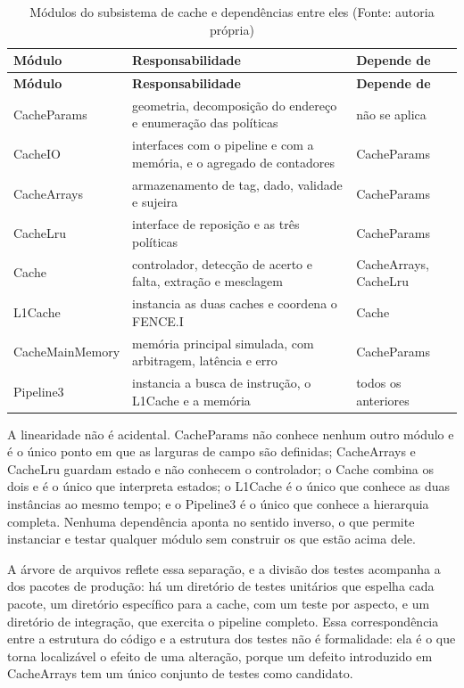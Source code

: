 {\small
\begin{longtable}{@{}>{\raggedright\arraybackslash}p{}>{\raggedright\arraybackslash}p{}>{\raggedright\arraybackslash}p{}@{}}
\caption[Módulos do subsistema de cache e dependências entre eles]{Módulos do subsistema de cache e dependências entre eles (Fonte: autoria própria)}\label{tab:5.1}\\
\hline
\textbf{Módulo} & \textbf{Responsabilidade} & \textbf{Depende de} \\
\hline
\endfirsthead
\hline
\textbf{Módulo} & \textbf{Responsabilidade} & \textbf{Depende de} \\
\hline
\endhead
\hline
\endlastfoot
CacheParams & geometria, decomposição do endereço e enumeração das políticas & não se aplica \\
CacheIO & interfaces com o pipeline e com a memória, e o agregado de contadores & CacheParams \\
CacheArrays & armazenamento de tag, dado, validade e sujeira & CacheParams \\
CacheLru & interface de reposição e as três políticas & CacheParams \\
Cache & controlador, detecção de acerto e falta, extração e mesclagem & CacheArrays, CacheLru \\
L1Cache & instancia as duas caches e coordena o FENCE.I & Cache \\
CacheMainMemory & memória principal simulada, com arbitragem, latência e erro & CacheParams \\
Pipeline3 & instancia a busca de instrução, o L1Cache e a memória & todos os anteriores \\
\end{longtable}
}

A linearidade não é acidental. CacheParams não conhece nenhum outro módulo e é o único ponto em que as larguras de campo são definidas; CacheArrays e CacheLru guardam estado e não conhecem o controlador; o Cache combina os dois e é o único que interpreta estados; o L1Cache é o único que conhece as duas instâncias ao mesmo tempo; e o Pipeline3 é o único que conhece a hierarquia completa. Nenhuma dependência aponta no sentido inverso, o que permite instanciar e testar qualquer módulo sem construir os que estão acima dele.

A árvore de arquivos reflete essa separação, e a divisão dos testes acompanha a dos pacotes de produção: há um diretório de testes unitários que espelha cada pacote, um diretório específico para a cache, com um teste por aspecto, e um diretório de integração, que exercita o pipeline completo. Essa correspondência entre a estrutura do código e a estrutura dos testes não é formalidade: ela é o que torna localizável o efeito de uma alteração, porque um defeito introduzido em CacheArrays tem um único conjunto de testes como candidato.

